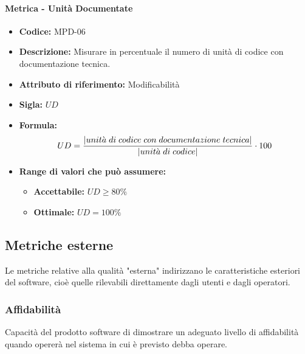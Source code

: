 \paragraph{Metrica - Unità Documentate} 
\begin{itemize}
    \item \textbf{Codice:} MPD-06
    \item \textbf{Descrizione:} Misurare in percentuale il numero di unità di codice con documentazione tecnica.
    \item \textbf{Attributo di riferimento:} Modificabilità
    \item \textbf{Sigla:} $UD$
    \item \textbf{Formula:} $$UD = {|unit\grave{a} \; di \; codice \; con \; documentazione \; tecnica| \over |unit\grave{a} \; di \; codice|} \cdot 100$$
    \item \textbf{Range di valori che può assumere:}
    \begin{itemize}
        \item \textbf{Accettabile:} $UD \geq 80\%  $
        \item \textbf{Ottimale:} $UD = 100\%$
    \end{itemize}
\end{itemize}
              
       
\subsection{Metriche esterne}
Le metriche relative alla qualità "esterna" indirizzano le caratteristiche esteriori del software, cioè quelle rilevabili direttamente dagli utenti e dagli operatori.

\subsubsection{Affidabilità}
Capacità del prodotto software di dimostrare un adeguato livello di affidabilità quando opererà nel sistema in cui è previsto debba operare.
    
